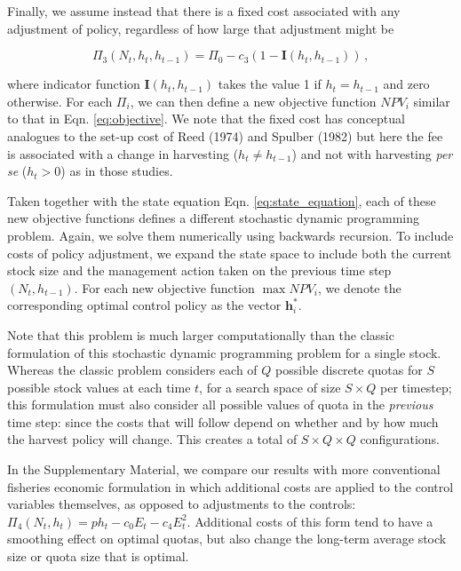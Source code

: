 \documentclass[review,12pt,author-year,titlepage]{components/elsarticle} %
\begin{document}
\begin{flushleft}
Finally, we assume instead that there is a fixed cost associated with
any adjustment of policy, regardless of how large that adjustment might
be

\begin{equation}
\Pi_{3}(N_t,h_t, h_{t-1}) = \Pi_0 - c_3 (1-\mathbf{I}(h_t, h_{t-1}))  \,,
\label{eq:Pi_3}
\end{equation}

where indicator function \(\mathbf{I}(h_t, h_{t-1})\) takes the value 1
if \(h_t=h_{t-1}\) and zero otherwise. For each \(\Pi_i\), we can then
define a new objective function \(NPV_i\) similar to that in Eqn.
\eqref{eq:objective}. We note that the fixed cost has conceptual
analogues to the set-up cost of Reed (1974) and Spulber (1982) but here
the fee is associated with a change in harvesting (\(h_t\neq h_{t-1}\))
and not with harvesting \emph{per se} (\(h_t>0\)) as in those studies.

Taken together with the state equation Eqn. \eqref{eq:state_equation},
each of these new objective functions defines a different stochastic
dynamic programming problem. Again, we solve them numerically using
backwards recursion. To include costs of policy adjustment, we expand
the state space to include both the current stock size and the
management action taken on the previous time step \((N_t,h_{t-1})\). For
each new objective function \(\max NPV_i\), we denote the corresponding
optimal control policy as the vector \(\mathbf{h}_i^*\).

Note that this problem is much larger computationally than the classic
formulation of this stochastic dynamic programming problem for a single
stock. Whereas the classic problem considers each of \(Q\) possible
discrete quotas for \(S\) possible stock values at each time \(t\), for
a search space of size \(S \times Q\) per timestep; this formulation
must also consider all possible values of quota in the \emph{previous}
time step: since the costs that will follow depend on whether and by how
much the harvest policy will change. This creates a total of
\(S \times Q \times Q\) configurations.

In the Supplementary Material, we compare our results with more
conventional fisheries economic formulation in which additional costs
are applied to the control variables themselves, as opposed to
adjustments to the controls:
\(\Pi_4 (N_t,h_t) = p h_t - c_0 E_t-c_4E_t^2\). Additional costs of this
form tend to have a smoothing effect on optimal quotas, but also change
the long-term average stock size or quota size that is optimal.


\end{flushleft}
\end{document}
